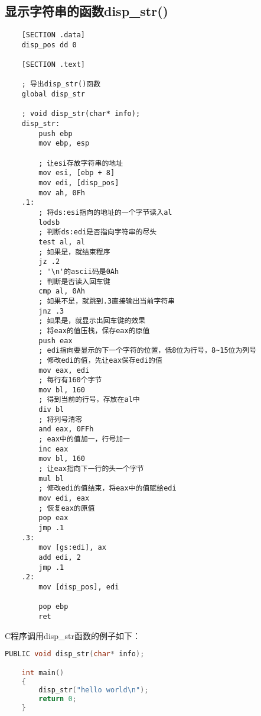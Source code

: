 \documentclass[a4paper,left=2.5cm,right=2.5cm,11pt]{article}
\begin{document}
\subsection{显示字符串的函数disp\_str()}
	\begin{lstlisting}
	[SECTION .data]
	disp_pos dd 0

	[SECTION .text]
	
	; 导出disp_str()函数
	global disp_str

	; void disp_str(char* info);
	disp_str:
		push ebp
		mov ebp, esp

		; 让esi存放字符串的地址
		mov esi, [ebp + 8]
		mov edi, [disp_pos]
		mov ah, 0Fh
	.1:
		; 将ds:esi指向的地址的一个字节读入al
		lodsb
		; 判断ds:edi是否指向字符串的尽头
		test al, al
		; 如果是，就结束程序
		jz .2
		; '\n'的ascii码是0Ah
		; 判断是否读入回车键
		cmp al, 0Ah
		; 如果不是，就跳到.3直接输出当前字符串
		jnz .3
		; 如果是，就显示出回车键的效果
		; 将eax的值压栈，保存eax的原值
		push eax
		; edi指向要显示的下一个字符的位置，低8位为行号，8~15位为列号
		; 修改edi的值，先让eax保存edi的值
		mov eax, edi
		; 每行有160个字节
		mov bl, 160
		; 得到当前的行号，存放在al中
		div bl
		; 将列号清零
		and eax, 0FFh
		; eax中的值加一，行号加一
		inc eax
		mov bl, 160
		; 让eax指向下一行的头一个字节
		mul bl
		; 修改edi的值结束，将eax中的值赋给edi
		mov edi, eax
		; 恢复eax的原值
		pop eax
		jmp .1
	.3:
		mov [gs:edi], ax
		add edi, 2
		jmp .1
	.2:
		mov [disp_pos], edi

		pop ebp
		ret
	\end{lstlisting}

	C程序调用disp\_str函数的例子如下：

	\begin{lstlisting}[language = C]
	PUBLIC void disp_str(char* info);

	int main()
	{
		disp_str("hello world\n");
		return 0;
	}
	\end{lstlisting}
\end{document}
